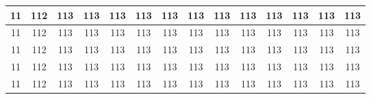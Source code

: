\begin{table}[H]
{\begin{tabular}{|c|c|c|c|c|c|c|c|c|c|c|c|c|c|}
            \hline
            11                  & 112                        & 113                                              & 113                                              & 113                                              & 113                                              & 113                                              & 113                                              & 113                & 113                & 113                & 113                & 113                & 113                \\
            \hline
            11                  & 112                        & 113                                              & 113                                              & 113                                              & 113                                              & 113                                              & 113                                              & 113                & 113                & 113                & 113                & 113                & 113                \\
            \hline
            11                  & 112                        & 113                                              & 113                                              & 113                                              & 113                                              & 113                                              & 113                                              & 113                & 113                & 113                & 113                & 113                & 113                \\
            \hline
            11                  & 112                        & 113                                              & 113                                              & 113                                              & 113                                              & 113                                              & 113                                              & 113                & 113                & 113                & 113                & 113                & 113                \\
            \hline
            11                  & 112                        & 113                                              & 113                                              & 113                                              & 113                                              & 113                                              & 113                                              & 113                & 113                & 113                & 113                & 113                & 113                \\

\end{tabular}}
\end{table}
